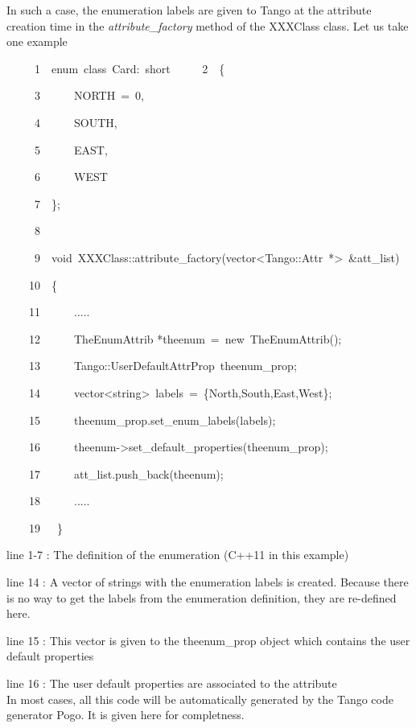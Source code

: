 In such a case, the enumeration labels are given to Tango at the attribute
creation time in the \emph{attribute\_factory} method of the XXXClass
class. Let us take one example



\begin{lyxcode}
~~~~~1~~enum~class~Card:~short
~~~~~2~~\{

~~~~~3~~~~~~NORTH~=~0,

~~~~~4~~~~~~SOUTH,

~~~~~5~~~~~~EAST,

~~~~~6~~~~~~WEST

~~~~~7~~\};

~~~~~8~

~~~~~9~~void~XXXClass::attribute\_factory(vector<Tango::Attr~{*}>~\&att\_list)

~~~~10~~\{

~~~~11~~~~~~.....

~~~~12~~~~~~TheEnumAttrib	{*}theenum~=~new~TheEnumAttrib();

~~~~13~~~~~~Tango::UserDefaultAttrProp~theenum\_prop;

~~~~14~~~~~~vector<string>~labels~=~\{\textquotedbl{}North\textquotedbl{},\textquotedbl{}South\textquotedbl{},\textquotedbl{}East\textquotedbl{},\textquotedbl{}West\textquotedbl{}\};

~~~~15~~~~~~theenum\_prop.set\_enum\_labels(labels);

~~~~16~~~~~~theenum->set\_default\_properties(theenum\_prop);

~~~~17~~~~~~att\_list.push\_back(theenum);

~~~~18~~~~~~.....

~~~~19~~~\}	
\end{lyxcode}


line 1-7 : The definition of the enumeration (C++11 in this example)

line 14 : A vector of strings with the enumeration labels is created.
Because there is no way to get the labels from the enumeration definition,
they are re-defined here.

line 15 : This vector is given to the theenum\_prop object which contains
the user default properties

line 16 : The user default properties are associated to the attribute\\

In most cases, all this code will be automatically generated by the
Tango code generator Pogo. It is given here for completness.

